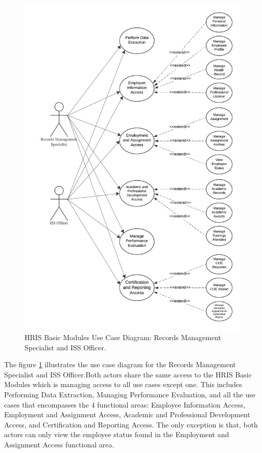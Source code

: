     \begin{figure}[H]
        \centering
        \includegraphics[width=0.9\linewidth]{figures/images/use-case-basic-4.png}
        \caption{HRIS Basic Modules Use Case Diagram: Records Management Specialist and ISS Officer.}
        \label{fig:use-case-basic-4}
    \end{figure}

    The figure \ref{fig:use-case-basic-4} illustrates the use case diagram for the Records Management Specialist and ISS Officer.Both actors share the same access to the HRIS Basic Modules which is managing access to all use cases except one. This includes Performing Data Extraction, Managing Performance Evaluation, and all the use cases that encompasses the 4 functional areas: Employee Information Access, Employment and Assignment Access, Academic and Professional Development Access, and Certification and Reporting Access. The only exception is that, both actors can only view the employee status found in the Employment and Assignment Access functional area.

